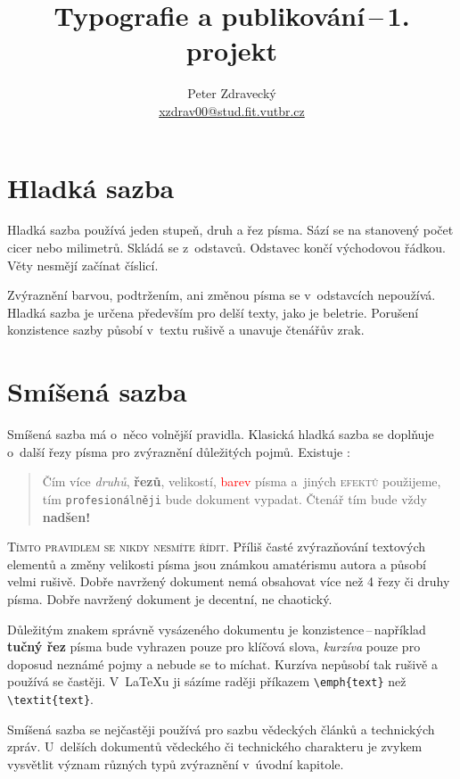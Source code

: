 \documentclass[10pt,twocolumn]{article}
\title{Typografie a publikování\,--\,1. projekt}
\author{Peter Zdravecký \\ \href{mailto:xzdrav00@stud.fit.vutbr.cz}{xzdrav00@stud.fit.vutbr.cz}}
\date{}
\begin{document}
\maketitle{}

\section{Hladká sazba}
Hladká sazba používá jeden stupeň, druh a řez písma.
Sází se na stanovený počet cicer nebo milimetrů.
Skládá se z~odstavců. Odstavec končí východovou řádkou.
Věty nesmějí začínat číslicí.

Zvýraznění barvou, podtržením, ani změnou písma se v~odstavcích nepoužívá.
Hladká sazba je určena především pro delší texty, jako je beletrie.
Porušení konzistence sazby působí v~textu rušivě a unavuje čtenářův zrak.


\section{Smíšená sazba}
\label{section2}
Smíšená sazba má o~něco volnější pravidla.
Klasická hladká sazba se doplňuje o~další řezy písma pro zvýraznění důležitých pojmů.
Existuje :
\begin{quotation}
    Čím více \emph{druhů}, \textbf{řezů}, {\tiny{velikostí}}, \textcolor{red}{barev} písma a~jiných \textsc{efektů} použijeme, tím \texttt{profesionálněji} bude {\Large {}\selectfont dokument} vypadat.
{\huge{Č}}{\LARGE{t}}{\Large{e}}{\large{n}}á{\small{ř}} {\footnotesize{t}}{\scriptsize{í}}{\tiny{m}} bude vždy {\Huge{\textbf{nadšen!}}}
\end{quotation}

\textsc{Tímto pravidlem se nikdy nesmíte řídit}.
Příliš časté zvýrazňování textových elementů a změny velikosti písma jsou známkou amatérismu autora a působí velmi rušivě.
Dobře navržený dokument nemá obsahovat více než 4 řezy či druhy písma.
Dobře navržený dokument je decentní, ne chaotický.

Důležitým znakem správně vysázeného dokumentu je konzistence\,--\,například \textbf{tučný řez} písma bude vyhrazen pouze pro klíčová slova, \emph{kurzíva} pouze pro doposud neznámé pojmy a nebude se to míchat.
Kurzíva nepůsobí tak rušivě a používá se častěji.
V~\LaTeX u ji sázíme raději příkazem \verb|\emph{text}| než \verb|\textit{text}|.

Smíšená sazba se nejčastěji používá pro sazbu vědeckých článků a technických zpráv.
U~delších dokumentů vědeckého či technického charakteru je zvykem vysvětlit význam různých typů zvýraznění v~úvodní kapitole.
\end{document}
